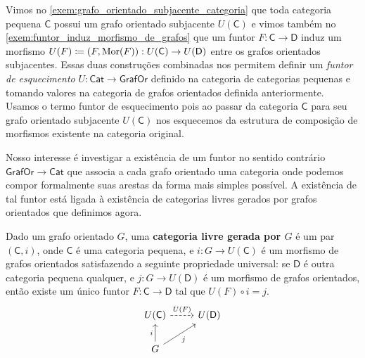 \begin{exem}\label{exem:funtor_esquecimento_cat_grafo_orientado}
    Vimos no \cref{exem:grafo_orientado_subjacente_categoria} que toda categoria pequena $\mathsf{C}$ possui um grafo orientado subjacente $U(\mathsf{C})$ e vimos também no \cref{exem:funtor_induz_morfismo_de_grafos} que um funtor $F: \mathsf{C} \to \mathsf{D}$ induz um morfismo $U(F) \coloneqq (F,\mathrm{Mor}(F)): U(\mathsf{C}) \to U(\mathsf{D})$ entre os grafos orientados subjacentes.
    Essas duas construções combinadas nos permitem definir um \emph{funtor de esquecimento} $U: \mathsf{Cat} \to \mathsf{GrafOr}$ definido na categoria de categorias pequenas e tomando valores na categoria de grafos orientados definida anteriormente.
    Usamos o termo funtor de esquecimento pois ao passar da categoria $\mathsf{C}$ para seu grafo orientado subjacente $U(\mathsf{C})$ nos esquecemos da estrutura de composição de morfismos existente na categoria original.
\end{exem}

Nosso interesse é investigar a existência de um funtor no sentido contrário $\mathsf{GrafOr} \to \mathsf{Cat}$ que associa a cada grafo orientado uma categoria onde podemos compor formalmente suas arestas da forma mais simples possível.
A existência de tal funtor está ligada à existência de categorias livres gerados por grafos orientados que definimos agora.

\begin{defin}\label{defin:categoria_livre}
    Dado um grafo orientado $G$, uma \textbf{categoria livre gerada por $G$} é um par $(\mathsf{C},i)$, onde $\mathsf{C}$ é uma categoria pequena, e $i: G \to U(\mathsf{C})$ é um morfismo de grafos orientados satisfazendo a seguinte propriedade universal: se $\mathsf{D}$ é outra categoria pequena qualquer, e $j: G \to U(\mathsf{D})$ é um morfismo de grafos orientados, então existe um único funtor $F: \mathsf{C} \to \mathsf{D}$ tal que $U(F) \circ i = j$.
    \begin{displaymath}
        \begin{tikzcd}
            U(\mathsf{C})
            \arrow[r, dashed, "U(F)"]
            & U(\mathsf{D})
            \\ G
            \arrow[u, "i"]
            \arrow[ru, "j" swap]
        \end{tikzcd}
    \end{displaymath}
\end{defin}